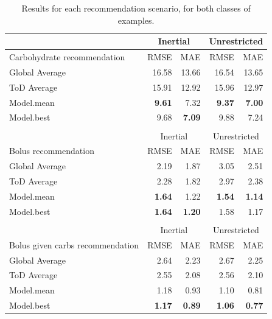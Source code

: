 \documentclass[graybox]{svmult}
\begin{document}
\begin{table}[t]\setlength{\tabcolsep}{4pt}
\caption{Results for each recommendation scenario, for both classes of examples.}
\begin{center}
\label{tab:results}
\begin{tabular}{|l|rr|rr|}

   	\cline{2-5}
	\multicolumn{1}{c}{} & \multicolumn{2}{|c|}{Inertial} & \multicolumn{2}{c|}{Unrestricted}\\
	\hline
	Carbohydrate recommendation & RMSE & MAE & RMSE & MAE\\
	\hline
	Global Average & 16.58 & 13.66 & 16.54 & 13.65\\
	ToD Average & 15.91 & 12.92 & 15.96 & 12.97\\
	\hline
	Model.mean & \textbf{9.61} & 7.32 & \textbf{9.37} & \textbf{7.00}\\
	Model.best & 9.68 & \textbf{7.09} & 9.88 & 7.24\\
	\hline
	\multicolumn{5}{c}{}\\[-1.5ex]
   	\cline{2-5}
	\multicolumn{1}{c}{} & \multicolumn{2}{|c|}{Inertial} & \multicolumn{2}{c|}{Unrestricted}\\
	\hline
	Bolus recommendation & RMSE & MAE & RMSE & MAE\\
	\hline
	Global Average & 2.19 & 1.87 & 3.05 & 2.51\\
	ToD Average & 2.28 & 1.82 & 2.97 & 2.38\\
	\hline
	Model.mean & \textbf{1.64} & 1.22 & \textbf{1.54} & \textbf{1.14}\\
	Model.best & \textbf{1.64} & \textbf{1.20} & 1.58 & 1.17\\
	\hline
	\multicolumn{5}{c}{}\\[-1.5ex]
   	\cline{2-5}
	\multicolumn{1}{c}{} & \multicolumn{2}{|c|}{Inertial} & \multicolumn{2}{c|}{Unrestricted}\\
	\hline
	Bolus given carbs recommendation & RMSE & MAE & RMSE & MAE\\
	\hline
	Global Average & 2.64 & 2.23 & 2.67 & 2.25\\
	ToD Average & 2.55 & 2.08 & 2.56 & 2.10\\
	\hline
	Model.mean & 1.18 & 0.93 & 1.10 & 0.81\\
	Model.best & \textbf{1.17} & \textbf{0.89} & \textbf{1.06} & \textbf{0.77}\\
	\hline
\end{tabular}
\end{center}
\end{table}
\end{document}
